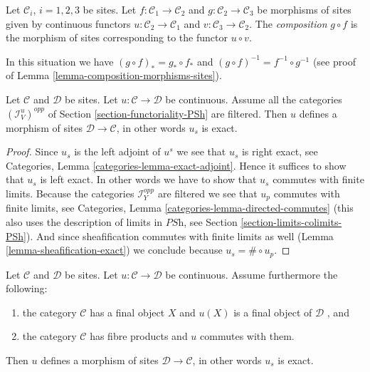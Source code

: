 \begin{definition}
\label{definition-composition-morphisms-sites}
Let $\mathcal{C}_i$, $i = 1, 2, 3$ be sites. Let
$f : \mathcal{C}_1 \to \mathcal{C}_2$ and
$g : \mathcal{C}_2 \to \mathcal{C}_3$ be morphisms of sites
given by continuous functors $u : \mathcal{C}_2 \to \mathcal{C}_1$
and $v : \mathcal{C}_3 \to \mathcal{C}_2$. The {\it composition}
$g \circ f$ is the morphism of sites corresponding to the
functor $u \circ v$.
\end{definition}

\noindent
In this situation we have $(g \circ f)_* = g_* \circ f_*$ and
$(g \circ f)^{-1} = f^{-1} \circ g^{-1}$ (see proof of
Lemma \ref{lemma-composition-morphisms-sites}).

\begin{lemma}
\label{lemma-directed-morphism}
Let $\mathcal{C}$ and $\mathcal{D}$ be sites. Let
$u : \mathcal{C} \to \mathcal{D}$ be continuous.
Assume all the categories $(\mathcal{I}_V^u)^{opp}$ of
Section \ref{section-functoriality-PSh}
are filtered. Then $u$ defines a morphism of sites $\mathcal{D} \to
\mathcal{C}$, in other words $u_s$ is exact.
\end{lemma}

\begin{proof}
Since $u_s$ is the left adjoint of $u^s$ we see that $u_s$ is right
exact, see Categories, Lemma \ref{categories-lemma-exact-adjoint}.
Hence it suffices to show that $u_s$ is left exact. In other words
we have to show that $u_s$ commutes with finite limits.
Because the categories $\mathcal{I}_Y^{opp}$ are filtered
we see that $u_p$ commutes with finite limits, see
Categories, Lemma \ref{categories-lemma-directed-commutes}
(this also uses the description of limits in $\textit{PSh}$,
see Section \ref{section-limits-colimits-PSh}).
And since sheafification commutes with finite limits as well
(Lemma \ref{lemma-sheafification-exact}) we conclude because
$u_s = \# \circ u_p$.
\end{proof}

\begin{proposition}
\label{proposition-get-morphism}
Let $\mathcal{C}$ and $\mathcal{D}$ be sites. Let
$u : \mathcal{C} \to \mathcal{D}$ be continuous.
Assume furthermore the following:
\begin{enumerate}
\item the category $\mathcal{C}$ has a final object $X$ and
$u(X)$ is a final object of $\mathcal{D}$ , and
\item the category $\mathcal{C}$ has fibre products and
$u$ commutes with them.
\end{enumerate}
Then $u$ defines a morphism of sites $\mathcal{D} \to
\mathcal{C}$, in other words $u_s$ is exact.
\end{proposition}

